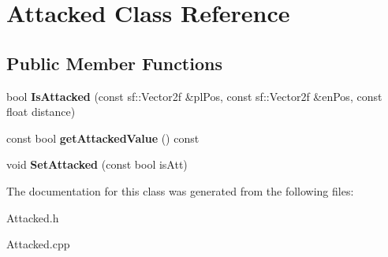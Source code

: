 \hypertarget{class_attacked}{}\section{Attacked Class Reference}
\label{class_attacked}
\subsection*{Public Member Functions}
\begin{DoxyCompactItemize}
\item 
\mbox{\label{class_attacked_a332e0315265c339cdf14d36c11802326}} 
bool {\bfseries Is\+Attacked} (const sf\+::\+Vector2f \&pl\+Pos, const sf\+::\+Vector2f \&en\+Pos, const float distance)
\item 
\mbox{\label{class_attacked_aa729fcb858345ae1553b05c56887f46f}} 
const bool {\bfseries get\+Attacked\+Value} () const
\item 
\mbox{\label{class_attacked_ae2d70d1290fdd99dfc3d379e0f769bd5}} 
void {\bfseries Set\+Attacked} (const bool is\+Att)
\end{DoxyCompactItemize}


The documentation for this class was generated from the following files\+:\begin{DoxyCompactItemize}
\item 
Attacked.\+h\item 
Attacked.\+cpp\end{DoxyCompactItemize}
